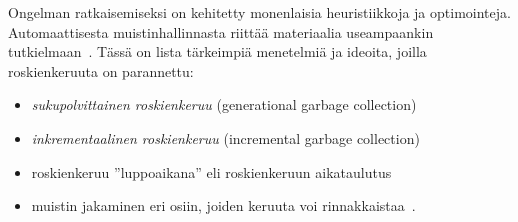Ongelman ratkaisemiseksi on kehitetty monenlaisia heuristiikkoja ja optimointeja. Automaattisesta muistinhallinnasta riittää materiaalia useampaankin tutkielmaan~\cite{gcbib}. Tässä on lista tärkeimpiä menetelmiä ja ideoita, joilla roskienkeruuta on parannettu:


\begin{itemize}
\item \textit{sukupolvittainen roskienkeruu} (generational garbage collection)~\cite{v8design}
\item \textit{inkrementaalinen roskienkeruu} (incremental garbage collection)~\cite{incrementalgc}
\item roskienkeruu ''luppoaikana'' eli roskienkeruun aikataulutus~\cite{freegc}
\item muistin jakaminen eri osiin, joiden keruuta voi rinnakkaistaa~\cite{ie10}.
\end{itemize}